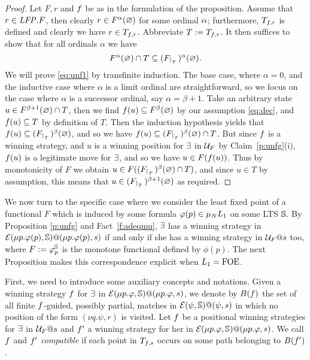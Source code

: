 \begin{proof}
Let $F,r$ and $f$ be as in the formulation of the proposition.
Assume that $r \in \mathit{LFP}. F$, then clearly $r \in F^{\alpha}(\varnothing)$ for some 
ordinal $\alpha$; furthermore, $T_{f,r}$ is defined and clearly we have 
$r \in T_{f,r}$.
Abbreviate $T \mathrel{:=} T_{f,r}$.
It then suffices to show that for all ordinals $\alpha$ we have
\begin{equation}
\label{eq:unf1}
F^{\alpha}(\varnothing) \cap T \subseteq (F_{{\upharpoonright}_{T}\,})^{\alpha}(\varnothing).
\end{equation}
We will prove \eqref{eq:unf1} by transfinite induction.
The base case, where $\alpha = 0$, and the inductive case where $\alpha$ is a 
limit ordinal are straightforward, so we focus on the case where $\alpha$ is a 
successor ordinal, say $\alpha = \beta +1$.
Take an arbitrary state $u \in F^{\beta+1}(\varnothing) \cap T$, then we 
find $f(u) \subseteq F^{\beta}(\varnothing)$ by our assumption \eqref{eq:dec}, and 
$f(u) \subseteq T$ by definition of $T$.
Then the induction hypothesis yields that 
$f(u) \subseteq (F_{{\upharpoonright}_{T}\,})^{\beta}(\varnothing)$, and so we have 
$f(u) \subseteq (F_{{\upharpoonright}_{T}\,})^{\beta}(\varnothing) \cap T$.
But since $f$ is a winning strategy, and $u$ is a winning position for 
$\exists$ in $\mathcal{U}_{F}$ by Claim~\ref{p:unfg}(i), $f(u)$ is a
legitimate move for $\exists$, and so we have $u \in F(f(u))$.
Thus by monotonicity of $F$ we obtain $u \in 
F((F_{{\upharpoonright}_{T}\,})^{\beta}(\varnothing) \cap T)$, and since $u \in T$ 
by assumption, this means that $u \in (F_{{\upharpoonright}_{T}\,})^{\beta+1}(\varnothing)$ as 
required.
\end{proof}

We now turn to the specific case where we consider the least fixed point of a 
functional $F$ which is induced by some formula $\varphi(p) \in 
\mu_{N}L_{1}$ on some LTS $\mathbb{S}$.   
By Proposition \ref{p:unfg} and Fact~\ref{f:adeqmu}, $\exists$ has a winning
strategy in  $\mathcal{E}(\mu p.\varphi(p),\mathbb{S})@(\mu p.\varphi(p),s)$ if and only if she
has a winning strategy in $\mathcal{U}_{F}@s$ too, where $F \mathrel{:=}  \varphi_{p}^{\mathbb{S}}$ is the 
monotone functional defined by $\phi(p)$. 
The next Proposition  makes this correspondence explicit when $L_{1} =
\mathrm{FOE}$. 


First, we need to introduce some auxiliary concepts and notations.
Given  a winning strategy   $f$ for $\exists$ in $\mathcal{E}(\mu p. \varphi,
\mathbb{S})@(\mu p. \varphi,s)$, we denote by $B(f)$ the set of all finite 
$f$-guided, possibly partial, matches in  $\mathcal{E}(\psi,\mathbb{S})@(\psi,s)$ in
which no position of the form $(\nu q. \psi, r)$ is visited. Let 
$f$ be a positional winning strategies for $\exists$ in $\mathcal{U}_F@s$ and 
$f'$ a winning strategy  for her in $\mathcal{E}(\mu p.\varphi,\mathbb{S})@(\mu p.\varphi,
s)$. We call $f$ and  $f'$  \emph{compatible} if
each point in $T_{f,s}$ occurs on some path belonging to $B(f')$. 

